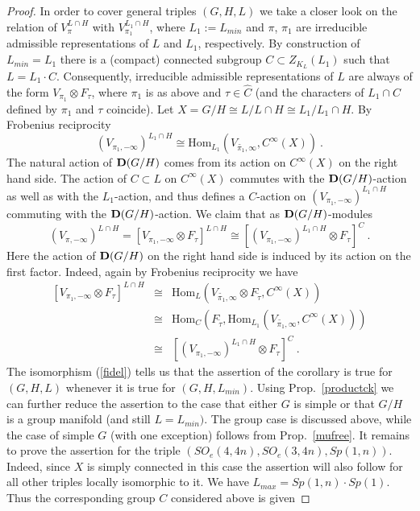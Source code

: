 \documentclass[10]{amsart}
\theoremstyle{remark}
\theoremstyle{definition}
\numberwithin{equation}{section}
\newcommand{\Hom}{\mathrm{Hom}}
\newcommand{\be}{\begin{equation}}
\begin{document}
{\begin{proof}
In order to cover general triples $(G,H,L)$ we take a closer look on the relation of $V_\pi^{L\cap H}$ with $V_{\pi_1}^{L_1\cap H}$, where $L_1:=L_{min}$ and
$\pi$, $\pi_1$ are irreducible admissible representations of $L$ and $L_1$, respectively. By construction of $L_{min}=L_1$ there is a (compact) connected subgroup $C\subset Z_{K_L}(L_1)$
such that $L=L_1\cdot C$. Consequently, irreducible admissible representations of $L$ are always of the form $V_{\pi_1}\otimes F_\tau$, where $\pi_1$ is as above and $\tau\in\hat C$ (and
the characters of $L_1\cap C$ defined by $\pi_1$ and $\tau$ coincide). Let $X=G/H\cong L/L\cap H\cong L_1/L_1\cap H$. By Frobenius reciprocity
$$ (V_{\pi_1,-\infty})^{L_1\cap H}\cong \Hom_{L_1}(V_{\widetilde{\pi_1},\infty},C^\infty (X))\ .$$
The natural action of ${\bf D}(G/H)$ comes from its action on $C^\infty(X)$ on the right hand side. The action of $C\subset L$ on $C^\infty(X)$ commutes with the ${\bf D}(G/H)$-action as well as
with the $L_1$-action, and thus defines a $C$-action on $(V_{\pi_1,-\infty})^{L_1\cap H}$ commuting with the ${\bf D}(G/H)$-action. 
We claim that as ${\bf D}(G/H)$-modules 
\be\label{fidel}
(V_{\pi,-\infty})^{L\cap H}=\left [ V_{\pi_1,-\infty}\otimes F_\tau\right ] ^{L\cap H}\cong \left[  (V_{\pi_1,-\infty})^{L_1\cap H}\otimes F_\tau\right ]^C\ .
\end{equation}
Here the action of ${\bf D}(G/H)$ on the right hand side is induced by its action on the first factor. Indeed, again by Frobenius reciprocity we have
\begin{eqnarray*}
\left[ V_{\pi_1,-\infty}\otimes F_\tau\right ] ^{L\cap H}&\cong& \Hom_{L}(V_{\widetilde{\pi_1},\infty}\otimes F_{\tilde\tau},C^\infty (X))\\
&\cong& \Hom_C\left(F_{\tilde\tau}, \Hom_{L_1}(V_{\widetilde{\pi_1},\infty},C^\infty (X))\right)\\
&\cong&  \left[  (V_{\pi_1,-\infty})^{L_1\cap H}\otimes F_\tau\right ]^C\ .
\end{eqnarray*}
The isomorphism (\ref{fidel}) tells us that the assertion of the corollary  is true for $(G,H,L)$ whenever it is true for $(G,H,L_{min})$. Using Prop.~\ref{productck} we can
further reduce the assertion to the case that either $G$ is simple or that $G/H$ is a group manifold (and still $L=L_{min})$. The group case is discussed above, while the case of simple $G$
(with one exception) follows from Prop.~\ref{mufree}. It remains to prove the assertion for the triple $(SO_e(4,4n), SO_e(3,4n), Sp(1,n))$. Indeed, since $X$ is simply connected in this case
the assertion will also follow for all other triples locally isomorphic to it. We have $L_{max}=Sp(1,n)\cdot Sp(1)$. Thus the corresponding group $C$ considered above is given

\end{proof}}
\end{document}
